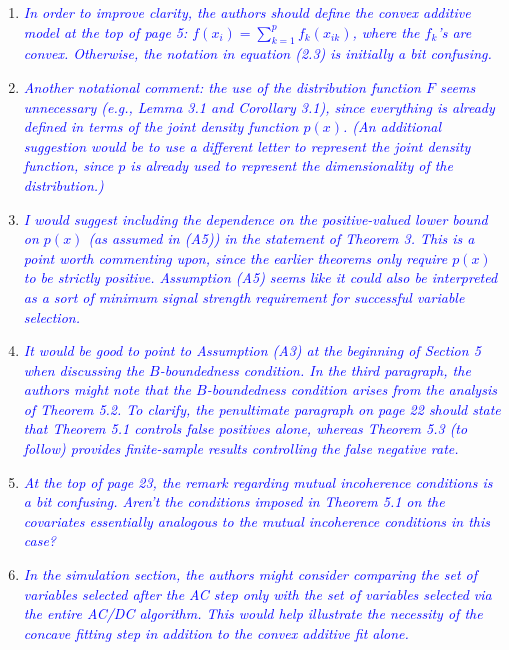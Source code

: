 \documentclass[pdftex,12pt]{article}
\def\rc#1{{\it\textcolor{blue}{#1}}\smallskip}
\begin{document}
\begin{enumerate}[(1)]
\item \rc{In order to improve clarity, the authors should define the convex
additive model at the top of page 5: $f(x_i) = \sum_{k=1}^p f_k(x_{ik})$, where the
$f_k$'s are convex.  Otherwise, the notation in equation (2.3) is
initially a bit confusing.}

\item \rc{Another notational comment: the use of the
distribution function $F$ seems unnecessary (e.g., Lemma 3.1 and
Corollary 3.1), since everything is already defined in terms of the
joint density function $p(x)$. (An additional suggestion would be to use
a different letter to represent the joint density function, since $p$ is
already used to represent the dimensionality of the distribution.)}

\item \rc{I would suggest including the dependence on the positive-valued lower
bound on $p(x)$ (as assumed in (A5)) in the statement of Theorem 3. This
is a point worth commenting upon, since the earlier theorems only
require $p(x)$ to be strictly positive. Assumption (A5) seems like it
could also be interpreted as a sort of minimum signal strength
requirement for successful variable selection.}

\item \rc{It would be good to point to Assumption (A3) at the beginning of
Section 5 when discussing the $B$-boundedness condition. In the third
paragraph, the authors might note that the $B$-boundedness condition
arises from the analysis of Theorem 5.2. To clarify, the penultimate
paragraph on page 22 should state that Theorem 5.1 controls false
positives alone, whereas Theorem 5.3 (to follow) provides
finite-sample results controlling the false negative rate.}

\item \rc{At the top
of page 23, the remark regarding mutual incoherence conditions is a
bit confusing. Aren’t the conditions imposed in Theorem 5.1 on the
covariates essentially analogous to the mutual incoherence conditions
in this case? }

\item \rc{In the simulation section, the authors might consider comparing the
set of variables selected after the AC step only with the set of
variables selected via the entire AC/DC algorithm. This would help
illustrate the necessity of the concave fitting step in addition to
the convex additive fit alone.}


\end{enumerate}
\end{document}
